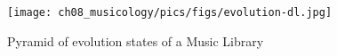 \begin{figure}[!ht]
	\centering
	\texttt{[image: ch08\_musicology/pics/figs/evolution-dl.jpg]}
	\caption{Pyramid of evolution states of a Music Library
	\label{fig:pyramid}}
\end{figure}





